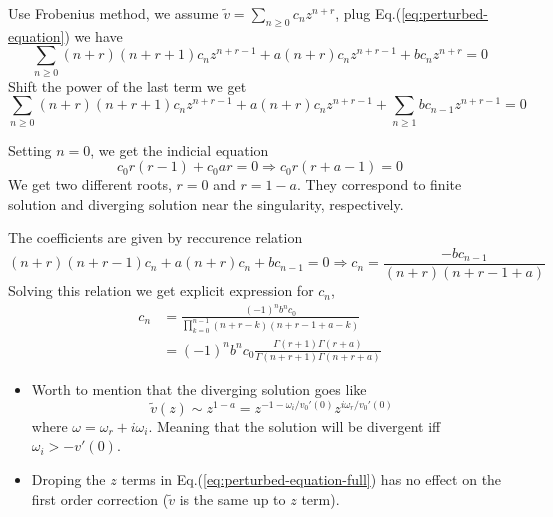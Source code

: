 Use Frobenius method, we assume $\tilde{v} = \sum_{n\geq 0}c_nz^{n+r}$, plug Eq.(\ref{eq:perturbed-equation}) we have
\[ \sum_{n \geq 0} (n+r)(n+r+1) c_n z^{n+r-1} + a(n+r)c_nz^{n+r-1} + bc_nz^{n+r} = 0\]
Shift the power of the last term we get
\[ \sum_{n \geq 0} (n+r)(n+r+1) c_n z^{n+r-1} + a(n+r)c_nz^{n+r-1} + \sum_{n \geq 1} bc_{n-1}z^{n+r-1} = 0\]

Setting $n=0$, we get the indicial equation
\[ c_0 r(r-1) + c_0 ar = 0 \Rightarrow c_0r(r+a-1) = 0 \]
We get two different roots, $r=0$ and $r=1-a$. They correspond to finite solution and diverging solution near the singularity, respectively.

The coefficients are given by reccurence relation
\[ (n+r)(n+r-1)c_n + a(n+r)c_n + bc_{n-1} = 0 
\Rightarrow
c_n = \frac{-bc_{n-1}}{(n+r)(n+r-1+a)}
\]
Solving this relation we get explicit expression for $c_n$,
\begin{equation}
    \begin{aligned}    
        c_n &= \frac{(-1)^n b^n c_0}{\prod_{k=0}^{n-1} (n+r-k)(n+r-1+a-k)} \\
        &= (-1)^n b^n c_0 \frac{\Gamma(r+1)\Gamma(r+a)}{\Gamma(n+r+1)\Gamma(n+r+a)}
    \end{aligned}
    \label{eq:coefficient}
\end{equation}

\begin{itemize}
    \item Worth to mention that the diverging solution goes like 
    \[ \tilde{v}(z) \sim z^{1-a} = z^{-1-\omega_i/v_0'(0)}z^{i\omega_r/v_0'(0)}  \]
    where $\omega = \omega_r + i\omega_i$. Meaning that the solution will be divergent iff $\omega_i > -v'(0)$.
    \item Droping the $z$ terms in Eq.(\ref{eq:perturbed-equation-full}) has no effect on the first order correction ($\tilde{v}$ is the same up to $z$ term).
\end{itemize}
